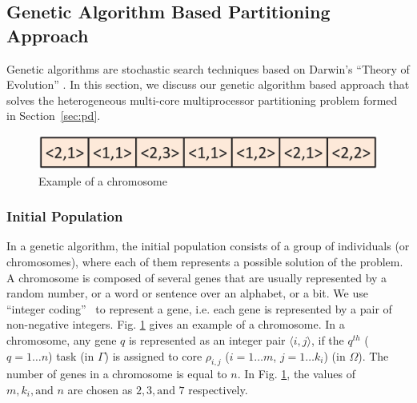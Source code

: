 \documentclass[conference]{IEEEtran}
\begin{document}
\subsection{Genetic Algorithm Based Partitioning Approach}

Genetic algorithms are stochastic search techniques based on Darwin's ``Theory of Evolution'' \cite{Goldberg}.
In this section, we discuss our genetic algorithm based approach that solves the heterogeneous multi-core multiprocessor partitioning problem formed in Section~\ref{sec:pd}.


\begin{figure}[h]
\vspace{-0.1in}
	\begin{center}
		\includegraphics[scale=0.35]{chromo.eps}
	\end{center}
	\vspace{-0.2in}
		\caption{Example of a chromosome}
	\label{fig:chromosome}
\end{figure}
\vspace{-0.1in}

\subsubsection{Initial Population} In a genetic algorithm, the initial population consists of a group of individuals (or chromosomes),
where each of them
represents a possible solution of the problem.
A chromosome is composed of several genes that are usually
represented by a random number, or a word or sentence over an
alphabet, or a bit. We use ``integer coding''~\cite{Goldberg} to represent a gene,
i.e. each gene is represented by a pair of non-negative integers. Fig. \ref{fig:chromosome} gives an example of a chromosome. %
In a chromosome, any gene $q$ is represented as an integer pair $\langle i,j\rangle$, if  the $q^{th}$ ($q=1\ldots n$) task (in $\Gamma$) is
assigned to core $\rho_{i,j}$ ($i=1\ldots m$, $j=1\ldots k_i$) (in $\Omega$). The number of genes in a chromosome is equal to $n$.
In  Fig. \ref{fig:chromosome}, the values of $m, k_i, \text{and } n$ are chosen as $2, 3, \text{and } 7$ respectively.
\end{document}
